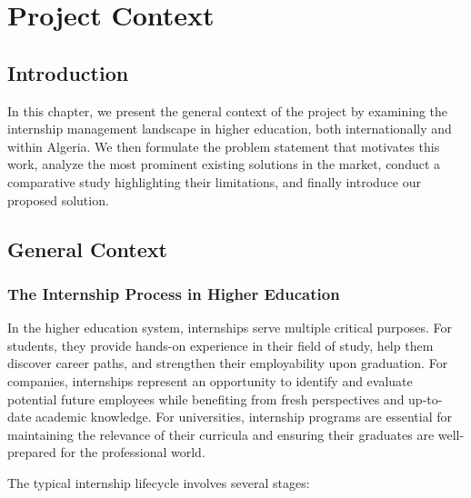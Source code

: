 
\chapter{Project Context}

\section{Introduction}

In this chapter, we present the general context of the project by examining the internship management landscape in higher education, both internationally and within Algeria. We then formulate the problem statement that motivates this work, analyze the most prominent existing solutions in the market, conduct a comparative study highlighting their limitations, and finally introduce our proposed solution.

\section{General Context}

\subsection{The Internship Process in Higher Education}

In the higher education system, internships serve multiple critical purposes. For students, they provide hands-on experience in their field of study, help them discover career paths, and strengthen their employability upon graduation. For companies, internships represent an opportunity to identify and evaluate potential future employees while benefiting from fresh perspectives and up-to-date academic knowledge. For universities, internship programs are essential for maintaining the relevance of their curricula and ensuring their graduates are well-prepared for the professional world.

The typical internship lifecycle involves several stages:

